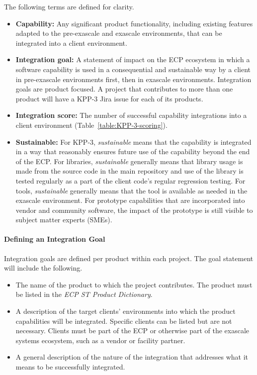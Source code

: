 \noindent
The following terms are defined for clarity.
\begin{itemize}
	\item \textbf{Capability:} Any significant product functionality, including existing features adapted to the pre-exascale and exascale environments, that can be integrated into a client environment.
	\item \textbf{Integration goal:} A statement of impact on the ECP ecosystem in which a software capability is used in a consequential and sustainable way by a client in pre-exascale environments first, then in exascale environments.  Integration goals are product focused.  A project that contributes to more than one product will have a KPP-3 Jira issue for each of its products.
	\item \textbf{Integration score: }The number of successful capability integrations into a client environment (Table~\ref{table:KPP-3-scoring}).
	\item \textbf{Sustainable:} For KPP-3, \textit{sustainable} means that the capability is integrated in a way that reasonably ensures future use of the capability beyond the end of the ECP.  For libraries, \textit{sustainable} generally means that library usage is made from the source code in the main repository and use of the library is tested regularly as a part of the client code's regular regression testing.  For tools, \textit{sustainable} generally means that the tool is available as needed in the exascale environment.  For prototype capabilities that are incorporated into vendor and community software, the impact of the prototype is still visible to subject matter experts (SMEs).
\end{itemize}

\paragraph{Defining an Integration Goal}
Integration goals are defined per product within each project.  The goal statement will include the following.
\begin{itemize}
	\item The name of the product to which the project contributes.  The product must be listed in the \textit{ECP ST Product Dictionary}.
	\item A description of the target clients' environments into which the product capabilities will be integrated.  Specific clients can be listed but are not necessary.  Clients must be part of the ECP or otherwise part of the exascale systems ecosystem, such as a vendor or facility partner.   
	\item A general description of the nature of the integration that addresses what it means to be successfully integrated.
\end{itemize}

